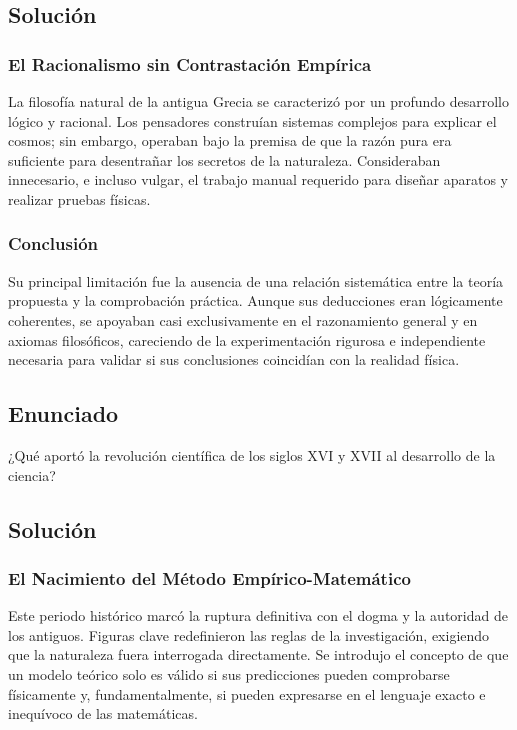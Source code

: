 \documentclass[12pt, a4paper]{article}
\begin{document}
\subsection*{Solución}

\subsubsection*{El Racionalismo sin Contrastación Empírica}
La filosofía natural de la antigua Grecia se caracterizó por un profundo desarrollo lógico y racional. Los pensadores construían sistemas complejos para explicar el cosmos; sin embargo, operaban bajo la premisa de que la razón pura era suficiente para desentrañar los secretos de la naturaleza. Consideraban innecesario, e incluso vulgar, el trabajo manual requerido para diseñar aparatos y realizar pruebas físicas.

\subsubsection*{Conclusión}
Su principal limitación fue la ausencia de una relación sistemática entre la teoría propuesta y la comprobación práctica. Aunque sus deducciones eran lógicamente coherentes, se apoyaban casi exclusivamente en el razonamiento general y en axiomas filosóficos, careciendo de la experimentación rigurosa e independiente necesaria para validar si sus conclusiones coincidían con la realidad física.

\newpage

\subsection*{Enunciado}
¿Qué aportó la revolución científica de los siglos XVI y XVII al desarrollo de la ciencia?

\subsection*{Solución}

\subsubsection*{El Nacimiento del Método Empírico-Matemático}
Este periodo histórico marcó la ruptura definitiva con el dogma y la autoridad de los antiguos. Figuras clave redefinieron las reglas de la investigación, exigiendo que la naturaleza fuera interrogada directamente. Se introdujo el concepto de que un modelo teórico solo es válido si sus predicciones pueden comprobarse físicamente y, fundamentalmente, si pueden expresarse en el lenguaje exacto e inequívoco de las matemáticas.
\end{document}
